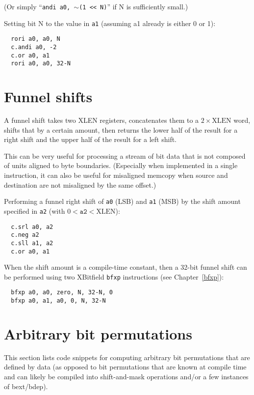 (Or simply ``{\tt andi a0, $\sim$(1 << N)}'' if N is sufficiently small.)

Setting bit N to the value in {\tt a1} (assuming a1 already is either 0 or 1):

\begin{verbatim}
  rori a0, a0, N
  c.andi a0, -2
  c.or a0, a1
  rori a0, a0, 32-N
\end{verbatim}

\section{Funnel shifts}
\label{funnel}

A funnel shift takes two XLEN registers, concatenates them to a $2 \times \textrm{XLEN}$ word,
shifts that by a certain amount, then returns the lower half of the result
for a right shift and the upper half of the result for a left shift.

This can be very useful for processing a stream of bit data that is not
composed of units aligned to byte boundaries. (Especially when implemented
in a single instruction, it can also be useful for misaligned memcopy when
source and destination are not misaligned by the same offset.)

Performing a funnel right shift of {\tt a0} (LSB) and {\tt a1} (MSB) by the
shift amount specified in {\tt a2} (with $0 < \texttt{a2} < \textrm{XLEN}$):

\begin{verbatim}
  c.srl a0, a2
  c.neg a2
  c.sll a1, a2
  c.or a0, a1
\end{verbatim}

When the shift amount is a compile-time constant, then a 32-bit funnel shift can be
performed using two XBitfield {\tt bfxp} instructions (see Chapter~\ref{bfxp}):

\begin{verbatim}
  bfxp a0, a0, zero, N, 32-N, 0
  bfxp a0, a1, a0, 0, N, 32-N
\end{verbatim}

\section{Arbitrary bit permutations}

This section lists code snippets for computing arbitrary bit permutations that
are defined by data (as opposed to bit permutations that are known at compile
time and can likely be compiled into shift-and-mask operations and/or a few
instances of bext/bdep).

